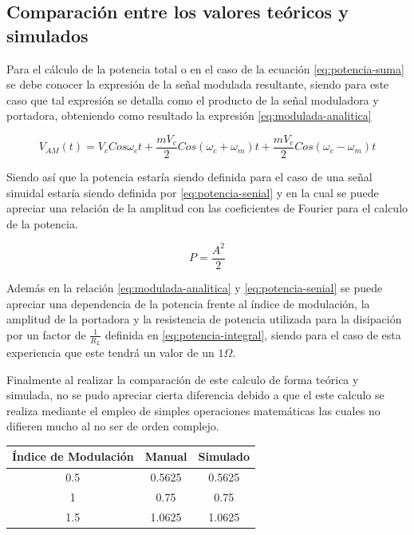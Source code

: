 \documentclass[conference]{IEEEtran}
\begin{document}
	\subsection{Comparación entre los valores teóricos y simulados}
	
	Para el cálculo de la potencia total o en el caso de la ecuación \ref{eq:potencia-suma} se debe conocer la expresión de la señal modulada resultante, siendo para este caso que tal expresión se detalla como el producto de la señal moduladora y portadora, obteniendo como resultado la expresión \ref{eq:modulada-analitica}
	
	\begin{equation}
		V_{AM}(t) = V_cCos\omega_ct + \frac{mV_c}{2}Cos(\omega_c + \omega_m)t + \frac{mV_c}{2}Cos(\omega_c - \omega_m)t 
		\label{eq:modulada-analitica}
	\end{equation}
	
	Siendo así que la potencia estaría siendo definida para el caso de una señal sinuidal estaría siendo definida por \ref{eq:potencia-senial} y en la cual se puede apreciar una relación de la amplitud con las coeficientes de Fourier para el calculo de la potencia.
	
	\begin{equation}
		P = \frac{A^2}{2}
		\label{eq:potencia-senial}
	\end{equation}
	
	Además en la relación \ref{eq:modulada-analitica} y \ref{eq:potencia-senial} se puede apreciar una dependencia de la potencia frente al índice de modulación, la amplitud de la portadora y la resistencia de potencia utilizada para la disipación por un factor de $\frac{1}{R_L}$ definida en \ref{eq:potencia-integral}, siendo para el caso de esta experiencia que este tendrá un valor de un $1\Omega$.
	
	Finalmente al realizar la comparación de este calculo de forma teórica y simulada, no se pudo apreciar cierta diferencia debido a que el este calculo se realiza mediante el empleo de simples operaciones matemáticas las cuales no difieren mucho al no ser de orden complejo.
	
	\begin{table}[]
		\centering
		\begin{tabular}{|c|c|c|}
			\hline
			\textbf{Índice de Modulación} & \textbf{Manual} & \multicolumn{1}{l|}{\textbf{Simulado}} \\ \hline
			0.5                           & 0.5625          & 0.5625                                 \\ \hline
			1                             & 0.75            & 0.75                                   \\ \hline
			1.5                           & 1.0625          & 1.0625                                 \\ \hline
		\end{tabular}
		\label{tab:comparacion-potencia}
	\end{table}
	
\end{document}
